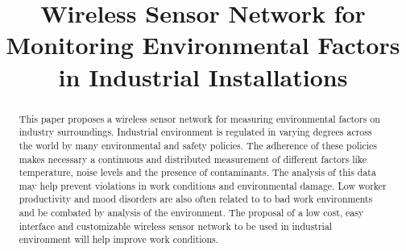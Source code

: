 \documentclass[conference]{IEEEtran}
\begin{document}
%
\title{Wireless Sensor Network for Monitoring Environmental Factors in Industrial Installations}


\author{
\and
{}
\and
{}
}

\maketitle

\begin{abstract}
This paper proposes a wireless sensor network for measuring environmental factors on industry surroundings.
Industrial environment is regulated in varying degrees across the world by many environmental and safety policies.
The adherence of these policies makes necessary a continuous and distributed measurement of different factors like temperature, noise levels and the presence of contaminants.
The analysis of this data may help prevent violations in work conditions and environmental damage. Low worker productivity and mood disorders are also often related to to bad work environments and be combated by analysis of the environment.
The proposal of a low cost, easy interface and customizable wireless sensor network to be used in industrial environment will help improve work conditions.
\end{abstract}
\end{document}
